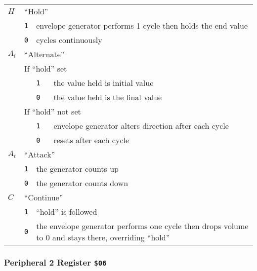     \hspace*{1.3cm}
    \begin{tabular}{lllp{18cm}}
        $H$ & \multicolumn{3}{l}{``Hold''} \\
            & {\tt 1} & \multicolumn{2}{p{10cm}}{envelope generator performs 1 cycle then holds the end value} \\
            & {\tt 0} & \multicolumn{2}{p{10cm}}{cycles continuously} \\

        $A_l$ & \multicolumn{3}{l}{``Alternate''} \\
            & \multicolumn{3}{l}{If ``hold'' set} \\
            & & {\tt 1} & the value held is initial value \\
            & & {\tt 0} & the value held is the final value \\
            & \multicolumn{3}{l}{If ``hold'' not set} \\
            & & {\tt 1} & envelope generator alters direction after each cycle \\
            & & {\tt 0} & resets after each cycle \\

        $A_t$ & \multicolumn{3}{l}{``Attack''} \\
            & {\tt 1} & \multicolumn{2}{l}{the generator counts up} \\
            & {\tt 0} & \multicolumn{2}{l}{the generator counts down} \\

        $C$ & \multicolumn{3}{l}{``Continue''} \\
            & {\tt 1} & \multicolumn{2}{l}{``hold'' is followed} \\
            & {\tt 0} & \multicolumn{2}{p{12cm}}{the envelope generator performs one cycle then drops volume to 0 and stays there, overriding ``hold''} \\
    \end{tabular}
\endgroup

\subsubsection{Peripheral 2 Register {\tt \$06}}

